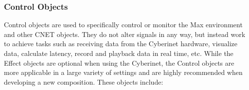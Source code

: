 
\subsubsection{Control Objects}

Control objects are used to specifically control or monitor the Max environment and other CNET objects. They do not alter signals in any way, but instead work to achieve tasks such as receiving data from the Cyberinet hardware, visualize data, calculate latency, record and playback data in real time, etc. While the Effect objects are optional when using the Cyberinet, the Control objects are more applicable in a large variety of settings and are highly recommended when developing a new composition. These objects include:


